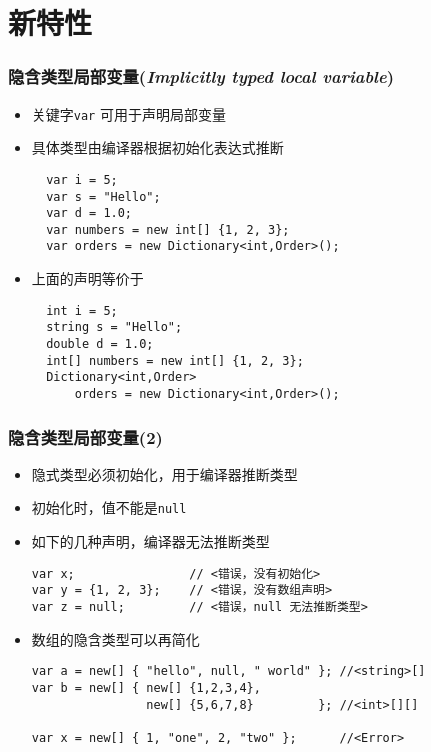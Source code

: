 
\section{新特性}

\begin{frame}[fragile]
\frametitle{隐含类型局部变量(\textit{Implicitly typed local variable})}

\begin{itemize}
\item 关键字\texttt{var} 可用于声明局部变量
\item 具体类型由编译器根据初始化表达式推断
\begin{lstlisting}
  var i = 5;
  var s = "Hello";
  var d = 1.0;
  var numbers = new int[] {1, 2, 3};
  var orders = new Dictionary<int,Order>();
\end{lstlisting}

\item 上面的声明等价于
\begin{lstlisting}
  int i = 5;
  string s = "Hello";
  double d = 1.0;
  int[] numbers = new int[] {1, 2, 3};
  Dictionary<int,Order>
      orders = new Dictionary<int,Order>();
\end{lstlisting}
\end{itemize}
\end{frame}

\begin{frame}[fragile]
\frametitle{隐含类型局部变量(2)}
\begin{itemize}
\item 隐式类型必须初始化，用于编译器推断类型
\item 初始化时，值不能是\texttt{null}
\item 如下的几种声明，编译器无法推断类型
\begin{lstlisting}[escapeinside=<>]
var x;                // <错误，没有初始化>
var y = {1, 2, 3};    // <错误，没有数组声明>
var z = null;         // <错误，null 无法推断类型>
\end{lstlisting}

\item 数组的隐含类型可以再简化
\begin{lstlisting}
var a = new[] { "hello", null, " world" }; //<string>[]
var b = new[] { new[] {1,2,3,4},
                new[] {5,6,7,8}         }; //<int>[][]

var x = new[] { 1, "one", 2, "two" };      //<Error>
\end{lstlisting}
\end{itemize}
\end{frame}

